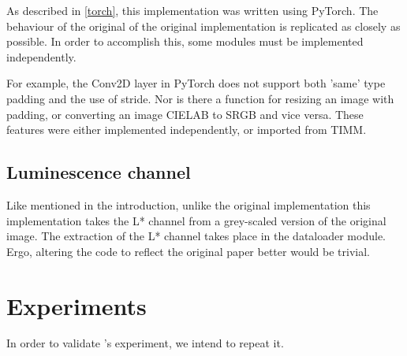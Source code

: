 \documentclass{article}
\begin{document}
        As described in \ref{torch}, this implementation was written using PyTorch. The behaviour of the original of the original implementation is replicated as closely as possible. In order to accomplish this, some modules must be implemented independently.
        
        For example, the Conv2D layer in PyTorch does not support both 'same' type padding and the use of stride. Nor is there a function for resizing an image with padding, or converting an image CIELAB to SRGB and vice versa. These features were either implemented independently, or imported from TIMM.
        
    \subsection{Luminescence channel}  \label{lum}
        Like mentioned in the introduction, unlike the original implementation this implementation takes the L* channel from a grey-scaled version of the original image. The extraction of the L* channel takes place in the dataloader module. Ergo, altering the code to reflect the original paper better would be trivial.
        


\section{Experiments} \label{experiments}

    In order to validate \cite{deepkoal2017}'s experiment, we intend to repeat it.
    
\end{document}
